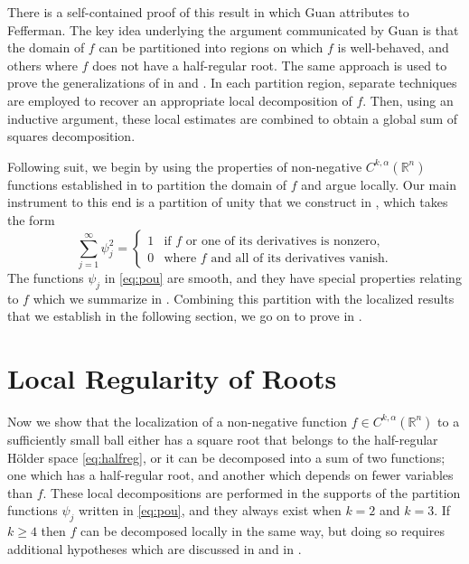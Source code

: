 \documentclass[oneside,hidelinks,indentfirst,10pt]{book}
\begin{document}
There is a self-contained proof of this result in \cite{Guan} which Guan attributes to Fefferman. The key idea underlying the argument communicated by Guan is that the domain of \(f\) can be partitioned into regions on which \(f\) is well-behaved, and others where \(f\) does not have a half-regular root. The same approach is used to prove the generalizations of  in \cite[Proposition 1.1]{Tataru} and \cite[Theorem 4.5]{SOS_I}.  In each partition region, separate techniques are employed to recover an appropriate local decomposition of \(f\). Then, using an inductive argument, these local estimates are combined to obtain a global sum of squares decomposition.


Following suit, we begin by using the properties of non-negative \(C^{k,\alpha}(\mathbb{R}^n)\) functions established in  to partition the domain of \(f\) and argue locally. Our main instrument to this end is a partition of unity that we construct in , which takes the form
\begin{equation}\label{eq:pou}
    \sum_{j=1}^\infty\psi_j^2=\begin{cases}
    1 & \textrm{if }f\textrm{ or one of its derivatives is nonzero},\\
    0 & \textrm{where }f\textrm{ and all of its derivatives  vanish}.
    \end{cases}
\end{equation}
The functions \(\psi_j\) in \eqref{eq:pou} are smooth, and they have special properties relating to \(f\) which we summarize in . Combining this partition with the localized results that we establish in the following section, we go on to prove  in .


\section{Local Regularity of Roots}\label{sec:reg}


Now we show that the localization of a non-negative function \(f\in C^{k,\alpha}(\mathbb{R}^n)\) to a sufficiently small ball either has a square root that belongs to the half-regular H\"older space \eqref{eq:halfreg}, or it can be decomposed into a sum of two functions; one which has a half-regular root, and another which depends on fewer variables than \(f\). These local decompositions are performed in the supports of the partition functions \(\psi_j\) written in \eqref{eq:pou}, and they always exist when \(k=2\) and \(k=3\). If \(k\geq4\) then \(f\) can be decomposed locally in the same way, but doing so requires additional hypotheses which are discussed in  and in \cite{SOS_I}.
\end{document}
